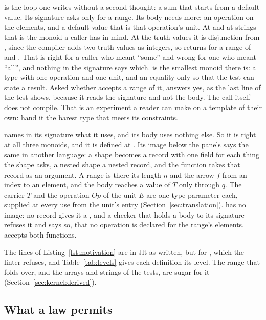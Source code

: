 is the loop one writes without a second thought: a sum that starts from a default value.
Its signature asks only for a range.
Its body needs more: an operation \cppinline{+} on the elements, and a default value that is that operation's unit.
At  and at strings that is the monoid a caller has in mind.
At the truth values it is disjunction from , since the compiler adds two truth values as integers, so  returns  for a range of  and .
That is right for a caller who meant ``some'' and wrong for one who meant ``all'', and nothing in the signature says which.
 is the smallest monoid there is: a type with one operation and one unit, and an equality only so that the test can state a result.
Asked whether  accepts a range of it, \Cpp{} answers yes, as the last line of the test shows, because it reads the signature and not the body.
The call itself does not compile.
That is an experiment a reader can make on a template of their own: hand it the barest type that meets its constraints.

 names in its signature what it uses, and its body uses nothing else.
So it is right at all three monoids, and it is defined at .
Its image below the panels says the same in another language: a shape becomes a record with one field for each thing the shape asks, a nested shape a nested record, and the function takes that record as an argument.
A range is there its length $n$ and the arrow $f$ from an index to an element, and the body reaches a value of $T$ only through $q$.
The carrier $T$ and the operation $\mathit{Op}$ of the unit $E$ are one type parameter each, supplied at every use from the unit's entry (Section~\ref{sec:translation}).
 has no image: no record gives it a \cppinline{+}, and a checker that holds a body to its signature refuses it and says so, that no operation \cppinline{+} is declared for the range's elements.
\Cpp{} accepts both functions.

The lines of Listing~\ref{lst:motivation} are in Jlt as written, but for , which the linter refuses, and Table~\ref{tab:levels} gives each definition its level.
The range that  folds over, and the arrays and strings of the tests, are sugar for it (Section~\ref{sec:kernel:derived}).

\subsection{What a law permits}
\label{sec:examples:law}

